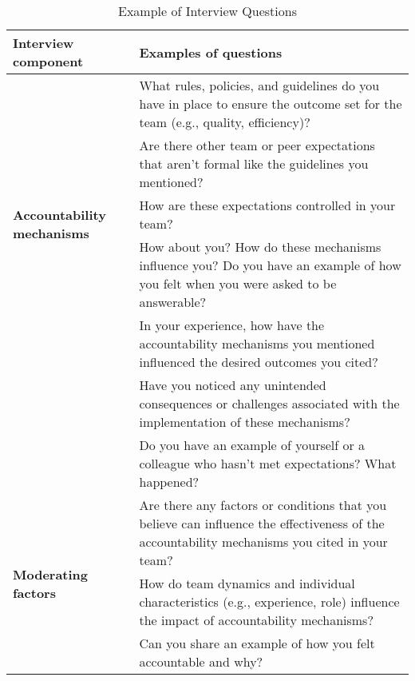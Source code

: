 \begin{table*}[th!]
\footnotesize
    \caption{Example of Interview Questions}

    \label{tab:phase1_guide}
    \renewcommand\arraystretch{1.8}
    
    \begin{tabular}{p{2.8cm}p{10.5cm}}
    \toprule
      \textbf{Interview component} & \textbf{Examples of questions}\\
      \hline
      
      \multirow{5}{2.8cm}{\textbf{Accountability mechanisms}} &  What rules, policies, and guidelines do you have in place to ensure the outcome set for the team (e.g., quality, efficiency)?\\
      
      & Are there other team or peer expectations that aren't formal like the guidelines you mentioned?\\

      & How are these expectations controlled in your team? \\

      & How about you? How do these mechanisms influence you? Do you have an example of how you felt when you were asked to be answerable?\\ \hline
      
      \multirow{4}{2.8cm}{\textbf{Outcomes sought by accountability mechanisms}} & In your experience, how have the accountability mechanisms you mentioned influenced the desired outcomes you cited?\\

      & Have you noticed any unintended consequences or challenges associated with the implementation of these mechanisms?\\

      &  Do you have an example of yourself or a colleague who hasn't met expectations? What happened?\\ \hline

      \multirow{4}{2.8cm}{\textbf{Moderating factors}} & Are there any factors or conditions that you believe can influence the effectiveness of the accountability mechanisms you cited in your team?\\
      
      &  How do team dynamics and individual characteristics (e.g., experience, role) influence the impact of accountability mechanisms?\\

      &  Can you share an example of how you felt accountable and why?\\
      
     \bottomrule
     
    \end{tabular}
  
\end{table*}

